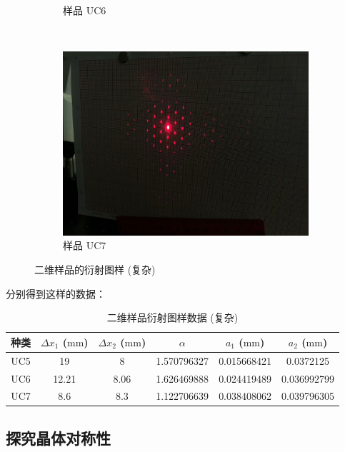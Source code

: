 \documentclass{customDoc}
\begin{document}
\begin{figure}[H]
\begin{subfigure}[b]{0.45\textwidth}
        \caption{样品 UC6}
        \label{fig:2D_6}
    \end{subfigure}
    \\
    \begin{subfigure}[b]{0.45\textwidth}
        \includegraphics[width=\textwidth]{UC7.jpg}
        \caption{样品 UC7}
        \label{fig:2D_7}
    \end{subfigure}
    \caption{二维样品的衍射图样 (复杂)}
    \label{fig:2D_complex}
\end{figure}

分别得到这样的数据：

\begin{table}[H]
  \centering
    \begin{tabular}{|c|c|c|c|c|c|}
    \hline
    种类    & $\Delta x_1$ ($\si{\milli\metre}$) & $\Delta x_2$ ($\si{\milli\metre}$) & $\alpha$     & $a_1$ ($\si{\milli\metre}$) & $a_2$ ($\si{\milli\metre}$) \\
    \hline
    UC5   & 19    & 8     & 1.570796327 & 0.015668421 & 0.0372125 \\
    \hline
    UC6   & 12.21 & 8.06  & 1.626469888 & 0.024419489 & 0.036992799 \\
    \hline
    UC7   & 8.6   & 8.3   & 1.122706639 & 0.038408062 & 0.039796305 \\
    \hline
    \end{tabular}%
    \caption{二维样品衍射图样数据 (复杂)}
  \label{tab:3}%
\end{table}%

\subsection{探究晶体对称性}
\end{document}
